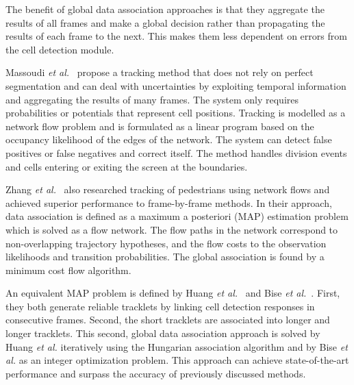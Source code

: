 The benefit of global data association approaches is that they aggregate the results of all frames and make a global decision rather than propagating the results of each frame to the next. This makes them less dependent on errors from the cell detection module.

Massoudi \emph{et al.}~\cite{massoudi12} propose a tracking method that does not rely on perfect segmentation and can deal with uncertainties by exploiting temporal information and aggregating the results of many frames. The system only requires probabilities or potentials that represent cell positions. Tracking is modelled as a network flow problem and is formulated as a linear program based on the occupancy likelihood of the edges of the network. The system can detect false positives or false negatives and correct itself. The method handles division events and cells entering or exiting the screen at the boundaries.

Zhang \emph{et al.}~\cite{zhang08} also researched tracking of pedestrians using network flows and achieved superior performance to frame-by-frame methods. In their approach, data association is defined as a maximum a posteriori (MAP) estimation problem which is solved as a flow network. The flow paths in the network correspond to non-overlapping trajectory hypotheses, and the flow costs to the observation likelihoods and transition probabilities. The global association is found by a minimum cost flow algorithm.

An equivalent MAP problem is defined by Huang \emph{et al.}~\cite{huang08} and Bise \emph{et al.}~\cite{bise11global}. First, they both generate reliable tracklets by linking cell detection responses in consecutive frames. Second, the short tracklets are associated into longer and longer tracklets. This second, global data association approach is solved by Huang \emph{et al.} iteratively using the Hungarian association algorithm \cite{kuhn55} and by Bise \emph{et al.} as an integer optimization problem. This approach can achieve state-of-the-art performance and surpass the accuracy of previously discussed methods.


